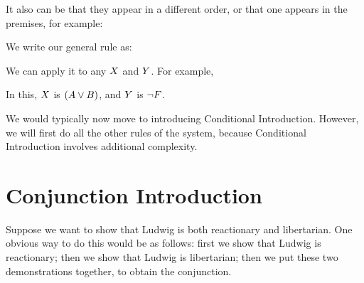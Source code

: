It also can be that they appear in a different order, or that one appears in the premises, for example:
\begin{pf}
	\ellipsesline
	\ellipsesline
	 
\end{pf}

We write our general rule as:

We can apply it to any $X$ and $Y$. 
For example, 
\begin{pf}
	 
\end{pf}
In this, $X$ is $(A\vee B)$, and $Y$ is $\neg F$.



We would typically now move to introducing Conditional Introduction. However, we will first do all the other rules of the system, because Conditional Introduction involves additional complexity. 

\section{Conjunction Introduction}
Suppose we want to show that Ludwig is both reactionary and libertarian. One obvious way to do this would be as follows: first we show that Ludwig is reactionary; then we show that Ludwig is libertarian; then we put these two demonstrations together, to obtain the conjunction.

